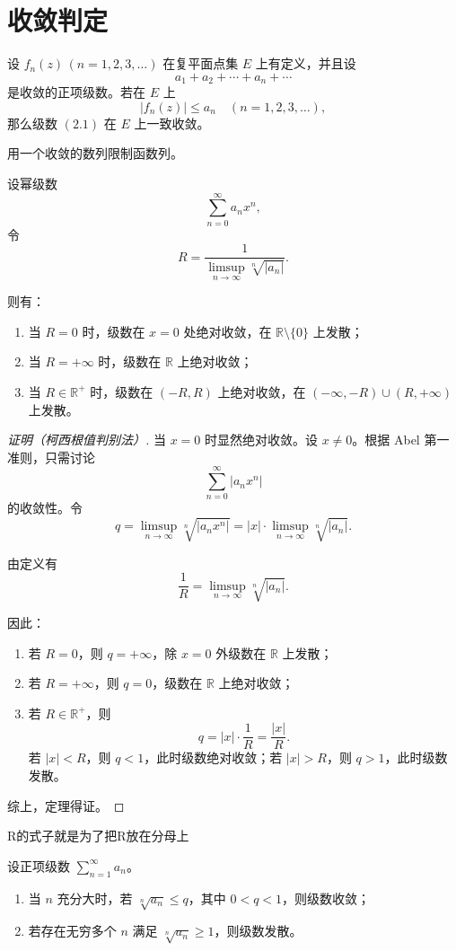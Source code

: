 \documentclass[lang=cn,10pt]{elegantbook}
\begin{document}
\section{收敛判定}
\begin{theorem}
设 $f_n(z)\,(n=1,2,3,\dots)$ 在复平面点集 $E$ 上有定义，并且设
\[
a_1 + a_2 + \cdots + a_n + \cdots
\]
是收敛的正项级数。若在 $E$ 上
\[
|f_n(z)| \leq a_n \quad (n=1,2,3,\dots),
\]
那么级数 $(2.1)$ 在 $E$ 上一致收敛。
\end{theorem}
用一个收敛的数列限制函数列。
\begin{theorem}
设幂级数
\[
\sum_{n=0}^{\infty} a_n x^n,
\]
令
\[
R = \frac{1}{\limsup\limits_{n \to \infty} \sqrt[n]{|a_n|}}.
\]

则有：
\begin{enumerate}
  \item 当 $R = 0$ 时，级数在 $x=0$ 处绝对收敛，在 $\mathbb{R} \setminus \{0\}$ 上发散；
  \item 当 $R = +\infty$ 时，级数在 $\mathbb{R}$ 上绝对收敛；
  \item 当 $R \in \mathbb{R}^+$ 时，级数在 $(-R,R)$ 上绝对收敛，在 $(-\infty,-R) \cup (R,+\infty)$ 上发散。
\end{enumerate}
\end{theorem}
\begin{proof}[证明（柯西根值判别法）]
当 $x=0$ 时显然绝对收敛。设 $x \neq 0$。根据 Abel 第一准则，只需讨论
\[
\sum_{n=0}^{\infty} |a_n x^n|
\]
的收敛性。令
\[
q = \limsup_{n \to \infty} \sqrt[n]{|a_n x^n|}
   = |x| \cdot \limsup_{n \to \infty} \sqrt[n]{|a_n|}.
\]

由定义有
\[
\frac{1}{R} = \limsup_{n \to \infty} \sqrt[n]{|a_n|}.
\]

因此：
\begin{enumerate}
  \item 若 $R = 0$，则 $q = +\infty$，除 $x=0$ 外级数在 $\mathbb{R}$ 上发散；
  \item 若 $R = +\infty$，则 $q = 0$，级数在 $\mathbb{R}$ 上绝对收敛；
  \item 若 $R \in \mathbb{R}^+$，则
  \[
  q = |x| \cdot \frac{1}{R} = \frac{|x|}{R}.
  \]
  若 $|x| < R$，则 $q < 1$，此时级数绝对收敛；若 $|x| > R$，则 $q > 1$，此时级数发散。
\end{enumerate}

综上，定理得证。
\end{proof}
\begin{dxtips}
    R的式子就是为了把R放在分母上
\end{dxtips}
\begin{theorem}[柯西根值判别法]
设正项级数 $\sum_{n=1}^{\infty} a_n$。
\begin{enumerate}
  \item 当 $n$ 充分大时，若 $\sqrt[n]{a_n} \leq q$，其中 $0 < q < 1$，则级数收敛；
  \item 若存在无穷多个 $n$ 满足 $\sqrt[n]{a_n} \geq 1$，则级数发散。
\end{enumerate}
\end{theorem}
\end{document}
